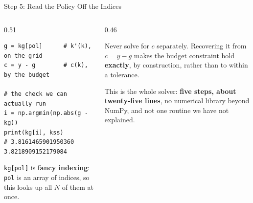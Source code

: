 \begin{frame}[fragile]{Step 5: Read the Policy Off the Indices}
\begin{columns}[T]
\begin{column}{0.51\textwidth}
\begin{lstlisting}
g = kg[pol]      # k'(k), on the grid
c = y - g        # c(k), by the budget

# the check we can actually run
i = np.argmin(np.abs(g - kg))
print(kg[i], kss)
# 3.8161465901950360 3.8218909152179084
\end{lstlisting}
\vspace{-1mm}
\small
\texttt{kg[pol]} is \textbf{fancy indexing}: \texttt{pol} is an array of indices, so this looks up all $N$ of them at once.
\end{column}
\begin{column}{0.46\textwidth}
\begin{conceptbox}[title=\textbf{Consumption comes from the budget}]\small
Never solve for $c$ separately. Recovering it from $c=y-g$ makes the budget constraint hold \textbf{exactly}, by construction, rather than to within a tolerance.
\end{conceptbox}
\medskip
\begin{takeawaybox}\footnotesize
This is the whole solver: \textbf{five steps, about twenty-five lines}, no numerical library beyond NumPy, and not one routine we have not explained.
\end{takeawaybox}
\end{column}
\end{columns}
\end{frame}

